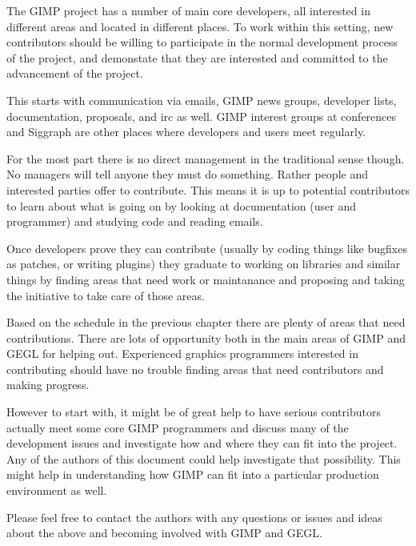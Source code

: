 The GIMP project has a number of main core developers, all interested in
different areas and located in different places. To work within this setting,
new contributors should be willing to participate in the normal development
process of the project, and demonstate that they are interested and committed
to the advancement of the project.

This starts with communication via emails, GIMP news groups, developer lists,
documentation, proposals, and irc as well. GIMP interest groups at conferences
and Siggraph are other places where developers and users meet regularly. 

For the most part there is no direct management in the traditional sense
though. No managers will tell anyone they must do something. Rather people and
interested parties offer to contribute. This means it is up to potential
contributors to learn about what is going on by looking at documentation (user
    and programmer) and studying code and reading emails. 

Once developers prove they can contribute (usually by coding things like
    bugfixes as patches, or writing plugins) they graduate to working on
libraries and similar things by finding areas that need work or maintanance and
proposing and taking the initiative to take care of those areas.

Based on the schedule in the previous chapter there are plenty of areas that
need contributions. There are lots of opportunity both in the main areas of
GIMP and GEGL for helping out. Experienced graphics programmers interested in
contributing should have no trouble finding areas that need contributors and
making progress. 

However to start with, it might be of great help to have serious contributors
actually meet some core GIMP programmers and discuss many of the development
issues and investigate how and where they can fit into the project. Any of the
authors of this document could help investigate that possibility. This might
help in understanding how GIMP can fit into a particular production environment
as well. 

Please feel free to contact the authors with any questions or issues and ideas
about the above and becoming involved with GIMP and GEGL.
